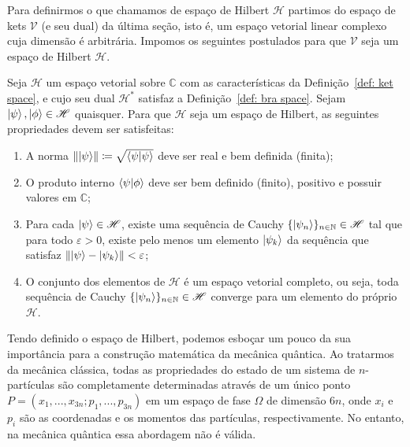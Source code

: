 Para definirmos o que chamamos de espaço de Hilbert $\mathscr{H}$ partimos do espaço de kets $\mathscr{V}$ (e seu dual) da última seção, isto é, um espaço vetorial linear complexo cuja dimensão é arbitrária. Impomos os seguintes postulados para que $\mathscr{V}$ seja um espaço de Hilbert $\mathscr{H}$.
            
\begin{definition}
    \label{def: Hilbert space}
    Seja $\mathscr{H}$ um espaço vetorial sobre $\mathbb{C}$ com as características da Definição~\ref{def: ket space}, e cujo seu dual $\mathscr{H}^{\ast}$ satisfaz a Definição~\ref{def: bra space}. Sejam $\ket{\psi},\ket{\phi}\in\mathscr{H}$ quaisquer. Para que $\mathscr{H}$ seja um espaço de Hilbert, as seguintes propriedades devem ser satisfeitas:
    \begin{enumerate}
        \item A norma $\norm{\ket{\psi}} \coloneqq \sqrt{\braket{\psi}}$ deve ser real e bem definida (finita);
        \item O produto interno $\braket{\psi}{\phi}$ deve ser bem definido (finito), positivo e possuir valores em $\mathbb{C}$;
        \item Para cada $\ket{\psi}\in\mathscr{H}$, existe uma sequência de Cauchy $\{\ket{\psi_{n}}\}_{n\in\mathbb{N}}\in\mathscr{H}$ tal que para todo $\varepsilon > 0$, existe pelo menos um elemento $\ket{\psi_{k}}$ da sequência que satisfaz $\norm{\ket{\psi} - \ket{\psi_{k}}} < \varepsilon$;
        \item O conjunto dos elementos de $\mathscr{H}$ é um espaço vetorial completo, ou seja, toda sequência de Cauchy $\{\ket{\psi_{n}}\}_{n\in\mathbb{N}}\in\mathscr{H}$ converge para um elemento do próprio $\mathscr{H}$. 
    \end{enumerate}
\end{definition}

Tendo definido o espaço de Hilbert, podemos esboçar um pouco da sua importância para a construção matemática da mecânica quântica. Ao tratarmos da mecânica clássica, todas as propriedades do estado de um sistema de $n$-partículas são completamente determinadas através de um único ponto $P = (x_{1},...,x_{3n};p_{1},...,p_{3n})$ em um espaço de fase $\Omega$ de dimensão $6n$, onde $x_{i}$ e $p_{i}$ são as coordenadas e os momentos das partículas, respectivamente. No entanto, na mecânica quântica essa abordagem não é válida. 

